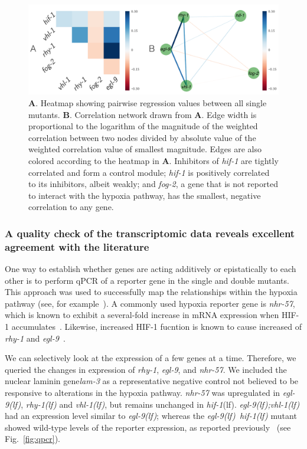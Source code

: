 \documentclass[10pt, onecolumn]{article}
\newcommand{\gene}[1]{\emph{#1}}
\newcommand{\nhr}{\emph{\mbox{nhr-57}}}
\newcommand{\lam}{\emph{\mbox{lam-3}}}
\newcommand{\egl}{\emph{\mbox{egl-9}(lf)}}
\newcommand{\rhy}{\emph{\mbox{rhy-1}(lf)}}
\newcommand{\vhl}{\emph{\mbox{vhl-1}(lf)}}
\newcommand{\eglvhl}{\emph{\mbox{egl-9(lf);vhl-1(lf)}}}
\newcommand{\eglhif}{\emph{\mbox{egl-9(lf)}~\mbox{hif-1(lf)}}}
\newcommand{\hif}{\emph{\mbox{hif-1}}(lf)}
\newcommand{\hifp}{HIF-1}
\begin{document}
\begin{figure}[tbhp]
\centering
\includegraphics[width=\linewidth]{../figs/bayesian-heatmap-horizontal.pdf}
\caption{
\textbf{A}. Heatmap showing pairwise regression values between all
single mutants. \textbf{B}. Correlation network drawn from \textbf{A}. Edge
width is proportional to the logarithm of the magnitude of the weighted
correlation between two nodes divided by absolute value of the weighted
correlation value of smallest magnitude. Edges are also colored according to the
heatmap in \textbf{A}. Inhibitors of \gene{hif-1} are tightly correlated and form
a control module;
\gene{hif-1} is positively correlated to its inhibitors, albeit weakly;
and
\gene{fog-2}, a gene that is not reported to interact with the hypoxia pathway,
has the smallest, negative correlation to any gene.
}
\label{fig:heatmap}
\end{figure}

\subsubsection*{A quality check of the transcriptomic data reveals excellent agreement
            with the literature}
\label{sub:quality_check}
One way to establish whether genes are acting additively or epistatically to each
other is to perform qPCR of a reporter gene in the single and double mutants. This
approach was used to successfully map the relationships within the hypoxia
pathway (see, for example~\cite{Shao2009,Shen2006}). A commonly used hypoxia reporter
gene is \nhr{}, which is known to exhibit a several-fold increase in mRNA
expression when \hifp{} accumulates~\cite{Shen2006,Shen2005,Park2012}. Likewise,
increased \hifp{} fucntion is known to cause increased of \gene{rhy-1}
and \gene{egl-9}~\cite{Powell-Coffman2010}.

We can
selectively look at the expression of a few genes at a time. Therefore, we
queried the changes in expression of \gene{rhy-1}, \gene{egl-9}, and \nhr{}. We
included the nuclear laminin gene\lam{} as a representative negative control not
believed to be responsive to alterations in the hypoxia pathway.
\nhr{} was upregulated in \egl{}, \rhy{} and \vhl{}, but remains unchanged in \hif{}.
\eglvhl{} had an expression level similar to \egl{}; whereas the
\eglhif{} mutant showed wild-type levels of the reporter expression, as reported
previously~\cite{Shen2006} (see Fig.~\ref{fig:qpcr}).
\end{document}
